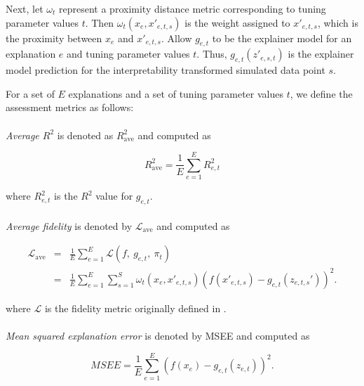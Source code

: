 \documentclass[AMS,STIX2COL]{WileyNJD-v2}\usepackage[]{graphicx}\usepackage[]{color}
\begin{document}
Next, let $\omega_t$ represent a proximity distance metric corresponding to tuning parameter values $t$. Then $\omega_t\left(x_e, x'_{e,t,s}\right)$ is the weight assigned to $x'_{e,t,s}$, which is the proximity between $x_e$ and $x'_{e,t,s}$. Allow $g_{e,t}$ to be the explainer model for an explanation $e$ and tuning parameter values $t$. Thus, $g_{e,t}\left(z'_{e,s,t}\right)$ is the explainer model prediction for the interpretability transformed simulated data point $s$. 

For a set of $E$ explanations and a set of tuning parameter values $t$, we define the assessment metrics as follows:\\
\\
\emph{Average $R^2$} is denoted as $R^2_{\mbox{ave}}$ and computed as

  $$R^2_{\mbox{ave}} = \frac{1}{E}\sum_{e=1}^E R_{e,t}^2$$

\noindent where $R_{e,t}^2$ is the $R^2$ value for $g_{e,t}$.\\
\\
\emph{Average fidelity} is denoted by $\mathcal{L}_{\mbox{ave}}$ and computed as

\begin{eqnarray*} \mathcal{L}_{\mbox{ave}} & = & \frac{1}{E}\sum_{e=1}^E\mathcal{L}(f, \ g_{e,t}, \ \pi_{t}) \\ & = & \frac{1}{E}\sum_{e=1}^E\sum_{s=1}^{S}\omega_{t}\left(x_e, x'_{e,t,s}\right)\left(f\left(x'_{e,t,s}\right)-g_{e,t}\left(z_{e,t,s}'\right)\right)^2. \end{eqnarray*}

\noindent where $\mathcal{L}$ is the fidelity metric originally defined in \citet{ribeiro:2016}.\\
\\
\emph{Mean squared explanation error} is denoted by MSEE and computed as

$$MSEE=\frac{1}{E}\sum_{e=1}^E\left(f\left(x_e\right)-g_{e,t}\left(z_{e,t}\right)\right)^2.$$
\end{document}

